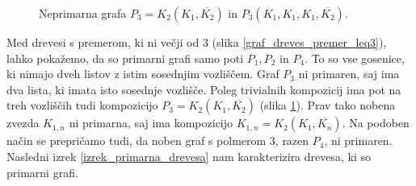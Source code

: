 \documentclass[a4paper, 12pt]{book}
\begin{document}
\begin{figure}[h]
    \begin{center}        
        \qquad
    \end{center}
    \caption{Neprimarna grafa $P_3 = K_2(K_1, \overline{K_2})$ in $P_3(K_1, K_1, K_1, \overline{K_2})$.}
    \label{graf_P3_graf_kompozicije_P3_P1_P1_P1_K2c}
\end{figure}

Med drevesi s premerom, ki ni večji od 3 (slika \ref{graf_dreves_premer_leq3}), lahko pokažemo, da so primarni grafi samo poti $P_1, P_2$ in $P_4$. To so vse gosenice, ki nimajo dveh listov z istim sosednjim vozliščem. Graf $P_3$ ni primaren, saj ima dva lista, ki imata isto sosednje vozlišče. Poleg trivialnih kompozicij ima pot na treh vozliščih tudi kompozicijo $P_3 = K_2(K_1, \overline{K_2})$ (slika \ref{graf_P3_graf_kompozicije_P3_P1_P1_P1_K2c}). Prav tako nobena zvezda $K_{1,n}$ ni primarna, saj ima kompozicijo $K_{1,n} = K_2(K_1, \overline{K_n})$. Na podoben način se prepričamo tudi, da noben graf s polmerom $3$, razen $P_4$, ni primaren. Nasledni izrek \ref{izrek_primarna_drevesa} nam karakterizira drevesa, ki so primarni grafi.
\end{document}
